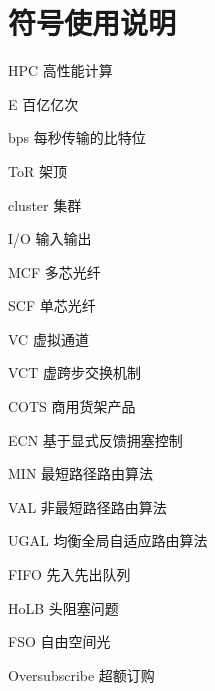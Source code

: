 \chapter*{符号使用说明}

\begin{denotation}

\item[HPC] 高性能计算
\item[E] 百亿亿次
\item[bps] 每秒传输的比特位
\item[ToR] 架顶
\item[cluster] 集群
\item[I/O] 输入输出
\item[MCF] 多芯光纤
\item[SCF] 单芯光纤
\item[VC] 虚拟通道
\item[VCT] 虚跨步交换机制
\item[COTS] 商用货架产品
\item[ECN] 基于显式反馈拥塞控制
\item[MIN] 最短路径路由算法
\item[VAL] 非最短路径路由算法
\item[UGAL] 均衡全局自适应路由算法
\item[FIFO] 先入先出队列
\item[HoLB] 头阻塞问题
\item[FSO] 自由空间光
\item[Oversubscribe] 超额订购

\end{denotation}
